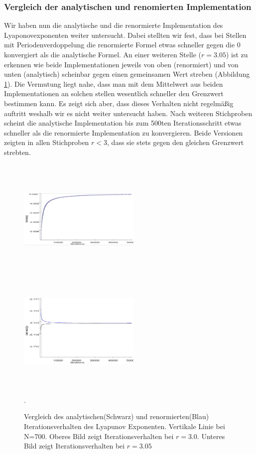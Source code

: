 \documentclass{scrartcl}
\begin{document}
\subsubsection{Vergleich der analytischen und renomierten Implementation}
Wir haben nun die analytische und die renormierte Implementation des Lyaponovexponenten weiter untersucht. Dabei stellten wir fest, dass bei Stellen mit Periodenverdoppelung die renormierte Formel etwas schneller gegen die 0 konvergiert als die analytische Formel. An einer weiteren Stelle ($r=3.05$) ist zu erkennen wie beide Implementationen jeweils von oben (renormiert) und von unten (analytisch) scheinbar gegen einen gemeinsamen Wert streben (Abbildung \ref{fig:lyapunov-compare}). Die Vermutung liegt nahe, dass man mit dem Mittelwert aus beiden Implementationen an solchen stellen wesentlich schneller den Grenzwert bestimmen kann. Es zeigt sich aber, dass dieses Verhalten nicht regelmäßig auftritt weshalb wir es nicht weiter untersucht haben. Nach weiteren Stichproben scheint die analytische Implementation bis zum 500ten Iterationsschritt etwas schneller als die renormierte Implementation zu konvergieren. Beide Versionen zeigten in allen Stichproben $r<3$, dass sie stets gegen den gleichen Grenzwert strebten.
\begin{figure}
\centering
\includegraphics[width=220px, height=220px]{lyapunov-analysis-300}
\includegraphics[width=220px, height=220px]{lyapunov-analysis-305}
\caption{Vergleich des analytischen(Schwarz) und renormierten(Blau) Iterationsverhalten des Lyapunov Exponenten. Vertikale Linie bei N=700. Oberes Bild zeigt Iterationsverhalten bei $r=3.0$. Unteres Bild zeigt Iterationsverhalten bei $r=3.05$ }. 
\label{fig:lyapunov-compare}
\end{figure}
\end{document}
